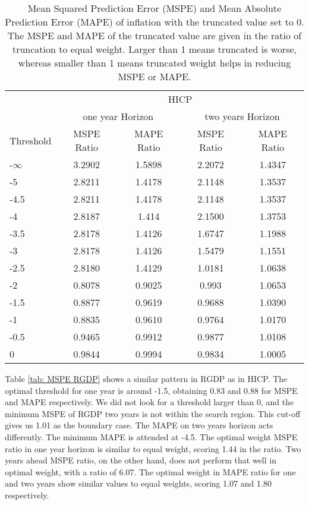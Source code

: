 \documentclass[11pt]{article}
\begin{document}
\begin{table}[!h]
	\centering
	\caption{Mean Squared Prediction Error (MSPE) and Mean Absolute Prediction Error (MAPE) of inflation with the truncated value set to 0. The MSPE and MAPE of the truncated value are given in the ratio of truncation to equal weight. Larger than 1 means truncated is worse, whereas smaller than 1 means truncated weight helps in reducing MSPE or MAPE.}
	\label{tab: MSPE HICP}
	\begin{tabular}{lcccc}
		\hline\hline
		&                        \multicolumn{4}{c}{HICP}                         \\
		\cmidrule(lr){2-5}                              & \multicolumn{2}{c}{one year Horizon} & \multicolumn{2}{c}{two years Horizon} \\
		\cmidrule(lr){2-3} \cmidrule(lr){4-5}
		Threshold & MSPE Ratio &    MAPE Ratio    & MSPE Ratio &    MAPE Ratio    \\ \hline
		-$\infty$ & 3.2902 & 1.5898 & 2.2072 & 1.4347\\ 
		-5 & 2.8211 & 1.4178 & 2.1148 & 1.3537\\ 
		-4.5 & 2.8211 & 1.4178 & 2.1148 & 1.3537\\ 
		-4 & 2.8187 & 1.414 & 2.1500 & 1.3753\\ 
		-3.5 & 2.8178 & 1.4126 & 1.6747 & 1.1988\\ 
		-3 & 2.8178 & 1.4126 & 1.5479 & 1.1551\\ 
		-2.5 & 2.8180 & 1.4129 & 1.0181 & 1.0638\\ 
		-2 & 0.8078 & 0.9025 & 0.993 & 1.0653\\ 
		-1.5 & 0.8877 & 0.9619 & 0.9688 & 1.0390\\ 
		-1 & 0.8835 & 0.9610 & 0.9764 & 1.0170\\ 
		-0.5 & 0.9465 & 0.9912 & 0.9877 & 1.0108\\ 
		0 & 0.9844 & 0.9994 & 0.9834 & 1.0005\\ 		 \hline\hline
	\end{tabular}
\end{table}

Table \ref{tab: MSPE RGDP} shows a similar pattern in RGDP as in HICP. The optimal threshold for one year is around -1.5, obtaining 0.83 and 0.88 for MSPE and MAPE respectively. We did not look for a threshold larger than 0, and the minimum MSPE of RGDP two years is not within the search region. This cut-off gives us 1.01 as the boundary case. The MAPE on two years horizon acts differently. The minimum MAPE is attended at -4.5. The optimal weight MSPE ratio in one year horizon is similar to equal weight, scoring 1.44 in the ratio. Two years ahead MSPE ratio, on the other hand, does not perform that well in optimal weight, with a ratio of 6.07. The optimal weight in MAPE ratio for one and two years show similar values to equal weights, scoring 1.07 and 1.80 respectively.
\end{document}
